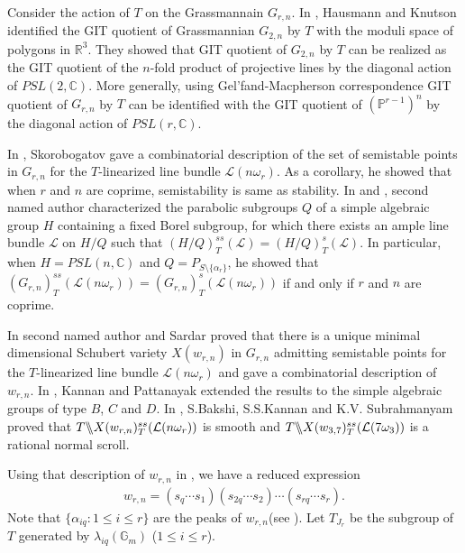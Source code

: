 \documentclass[12pt,reqno]{amsart}
\numberwithin{equation}{section}
\theoremstyle{definition}
\newcommand{\GmodX}[3]{#1 \backslash\mkern-6mu\backslash #2^{ss}_{#1}(#3)}
\begin{document}
Consider the action of $T$ on the Grassmannain $G_{r,n}$. In \cite{HK}, Hausmann and Knutson identified the GIT quotient of Grassmannian $G_{2,n}$ by $T$ with the moduli space of polygons in $\mathbb{R}^{3}$. They  showed that GIT quotient of $G_{2,n}$ by $T$ can be realized as the GIT quotient of the $n$-fold product of projective lines by the diagonal action of $PSL(2,\mathbb{C})$. More generally, using Gel'fand-Macpherson correspondence GIT quotient of $G_{r,n}$ by $T$ can be identified with the GIT quotient of $(\mathbb{P}^{r-1})^{n}$ by the diagonal action of $PSL(r,\mathbb{C})$.

In \cite{Sko}, Skorobogatov gave a combinatorial description of the set of semistable points in $G_{r,n}$ for the $T$-linearized line bundle $\mathcal{L}(n\omega_{r})$. As a corollary, he showed that when $r$ and $n$ are coprime, semistability is same as stability. In \cite{TorusquotientI} and \cite{TorusquotientII}, second named author characterized the parabolic subgroups $Q$ of a simple algebraic group $H$ containing a fixed Borel subgroup, for which there exists an ample line bundle $\mathcal{L}$ on $H/Q$
such that $(H/Q)^{ss}_{T}(\mathcal{L})=(H/Q)^{s}_{T}(\mathcal{L})$. In particular, when $H=PSL(n,\mathbb{C})$ and $Q=P_{S\setminus\{\alpha_{r}\}}$, he showed that $(G_{r,n})^{ss}_{T}(\mathcal{L}(n\omega_{r}))=(G_{r,n})^{s}_{T}(\mathcal{L}(n\omega_{r}))$ if and only if $r$ and $n$ are coprime.

 In \cite{sskannan} second named author and Sardar proved that there is a unique minimal dimensional Schubert variety $X(w_{r,n})$ in $G_{r,n}$ admitting semistable points for the $T$-linearized line bundle $\mathcal{L}(n\omega_{r})$ and gave a combinatorial description of $w_{r,n}$. In \cite{KP}, Kannan and Pattanayak extended the results to the simple algebraic groups of type $B$, $C$ and $D$. 
 In \cite{KB}, S.Bakshi, S.S.Kannan and K.V. Subrahmanyam proved that $\GmodX{T}{X(w_{r,n})}{\mathcal{L}(n\omega_{r})}$ is smooth and  $\GmodX{T}{X(w_{3,7})}{\mathcal{L}(7\omega_{3})}$ is a rational normal scroll.
 
  Using that description of $w_{r,n}$ in \cite{sskannan}, we have a reduced expression 
\begin{align*}
 w_{r,n}=(s_{q}\cdots s_{1})(s_{2q}\cdots s_{2})\cdots(s_{rq}\cdots s_{r}).
\end{align*} Note that $\{\alpha_{iq}:1\leq i\leq r\}$ are the peaks of $w_{r,n}$(see \cite[Definition 4.6]{Perrin}). Let $T_{J_{r}}$ be the subgroup of $T$ generated by $\lambda_{iq}(\mathbb{G}_{m})$ ($1\leq i\leq r$). 
\end{document}
